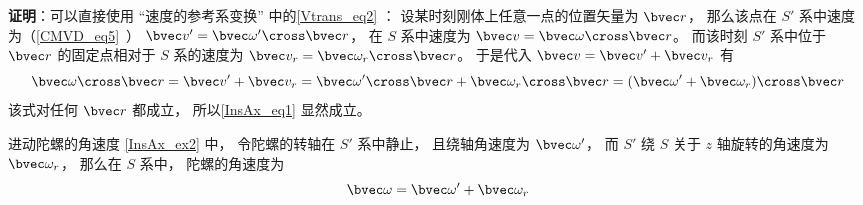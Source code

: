 \textbf{证明}：可以直接使用 “速度的参考系变换” 中的\autoref{Vtrans_eq2} ： 设某时刻刚体上任意一点的位置矢量为 $\bvec r$， 那么该点在 $S'$ 系中速度为（\autoref{CMVD_eq5}~） $\bvec v' = \bvec\omega'\cross\bvec r$， 在 $S$ 系中速度为 $\bvec v = \bvec\omega\cross\bvec r$。 而该时刻 $S'$ 系中位于 $\bvec r$ 的固定点相对于 $S$ 系的速度为 $\bvec v_r = \bvec\omega_r\cross\bvec r$。 于是代入 $\bvec v = \bvec v' + \bvec v_r$ 有
\begin{equation}
\bvec\omega\cross\bvec r = \bvec v' + \bvec v_r = \bvec\omega'\cross\bvec r + \bvec\omega_r\cross\bvec r
= (\bvec\omega' + \bvec\omega_r)\cross\bvec r
\end{equation}
该式对任何 $\bvec r$ 都成立， 所以\autoref{InsAx_eq1} 显然成立。

\begin{example}{进动陀螺的角速度}\label{InsAx_ex1}
\autoref{InsAx_ex2} 中， 令陀螺的转轴在 $S'$ 系中静止， 且绕轴角速度为 $\bvec \omega'$， 而 $S'$ 绕 $S$ 关于 $z$ 轴旋转的角速度为 $\bvec \omega_r$， 那么在 $S$ 系中， 陀螺的角速度为
\begin{equation}
\bvec \omega = \bvec \omega' + \bvec \omega_r
\end{equation}
\end{example}
